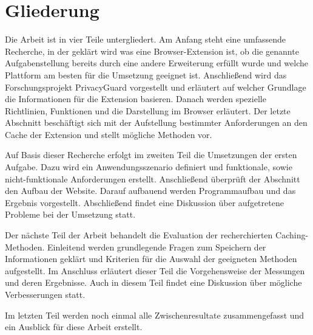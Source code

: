 \section{Gliederung}
\label{s:aufbauderarbeit}

Die Arbeit ist in vier Teile untergliedert. Am Anfang steht eine umfassende Recherche, in der geklärt wird was eine Browser-Extension ist, ob die genannte Aufgabenstellung bereits durch eine andere Erweiterung erfüllt wurde und welche Plattform am besten für die Umsetzung geeignet ist. Anschließend wird das Forschungsprojekt \glqq PrivacyGuard \grqq{} vorgestellt und erläutert auf welcher Grundlage die Informationen für die Extension basieren. Danach werden spezielle Richtlinien, Funktionen und die Darstellung im Browser erläutert. Der letzte Abschnitt beschäftigt sich mit der Aufstellung bestimmter Anforderungen an den Cache der Extension und stellt mögliche Methoden vor.

Auf Basis dieser Recherche erfolgt im zweiten Teil die Umsetzungen der ersten Aufgabe. Dazu wird ein Anwendungsszenario definiert und funktionale, sowie nicht-funktionale Anforderungen erstellt. Anschließend überprüft der Abschnitt den Aufbau der Website. Darauf aufbauend werden Programmaufbau und das Ergebnis vorgestellt. Abschließend findet eine Diskussion über aufgetretene Probleme bei der Umsetzung statt.

Der nächste Teil der Arbeit behandelt die Evaluation der recherchierten Caching-Methoden. Einleitend werden grundlegende Fragen zum Speichern der Informationen geklärt und Kriterien für die Auswahl der geeigneten Methoden aufgestellt. Im Anschluss erläutert dieser Teil die Vorgehensweise der Messungen und deren Ergebnisse. Auch in diesem Teil findet eine Diskussion über mögliche Verbesserungen statt.

Im letzten Teil werden noch einmal alle Zwischenresultate zusammengefasst und ein Ausblick für diese Arbeit erstellt.
